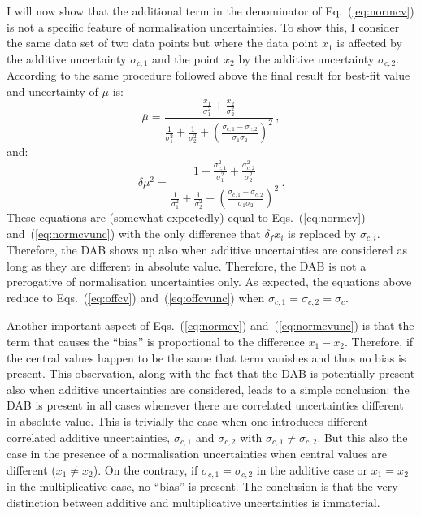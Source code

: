 \documentclass[10pt,a4paper]{article}
\begin{document}
I will now show that the additional term in the denominator of
Eq.~(\ref{eq:normcv}) is not a specific feature of normalisation
uncertainties. To show this, I consider the same data set of two data
points but where the data point $x_1$ is affected by the additive
uncertainty $\sigma_{c,1}$ and the point $x_2$ by the additive
uncertainty $\sigma_{c,2}$. According to the same procedure followed
above the final result for best-fit value and uncertainty of $\mu$ is:
\begin{equation}\label{eq:add2cv}
\overline{\mu} = \frac{\frac{x_1}{\sigma_1^2}+\frac{x_2}{\sigma_2^2}}{\frac{1}{\sigma_1^2}+\frac{1}{\sigma_2^2}+\left(\frac{\sigma_{c,1}-\sigma_{c,2}}{\sigma_1\sigma_2}\right)^2}\,,
\end{equation}
and:
\begin{equation}
  \delta\mu^2=\frac{1+\frac{\sigma_{c,1}^2}{\sigma_1^2}+\frac{\sigma_{c,2}^2}{\sigma_2^2}}{\frac{1}{\sigma_1^2}+ \frac{1}{\sigma_2^2}+\left(\frac{\sigma_{c,1} -\sigma_{c,2}}{\sigma_1\sigma_2}\right)^2}\,.
\end{equation}
These equations are (somewhat expectedly) equal to
Eqs.~(\ref{eq:normcv}) and~(\ref{eq:normcvunc}) with the only
difference that $\delta_fx_i$ is replaced by
$\sigma_{c,i}$. Therefore, the DAB shows up also when additive
uncertainties are considered as long as they are different in absolute
value. Therefore, the DAB is not a prerogative of normalisation
uncertainties only. As expected, the equations above reduce to
Eqs.~(\ref{eq:offcv}) and~(\ref{eq:offcvunc}) when
$\sigma_{c,1}=\sigma_{c,2}=\sigma_{c}$.

Another important aspect of Eqs.~(\ref{eq:normcv})
and~(\ref{eq:normcvunc}) is that the term that causes the ``bias'' is
proportional to the difference $x_1-x_2$. Therefore, if the central
values happen to be the same that term vanishes and thus no bias is
present. This observation, along with the fact that the DAB is
potentially present also when additive uncertainties are considered,
leads to a simple conclusion: the DAB is present in all cases whenever
there are correlated uncertainties different in absolute value. This
is trivially the case when one introduces different correlated
additive uncertainties, $\sigma_{c,1}$ and $\sigma_{c,2}$ with
$\sigma_{c,1}\neq \sigma_{c,2}$. But this also the case in the
presence of a normalisation uncertainties when central values are
different ($x_1\neq x_2$). On the contrary, if
$\sigma_{c,1}= \sigma_{c,2}$ in the additive case or $x_1=x_2$ in the
multiplicative case, no ``bias'' is present. The conclusion is that
the very distinction between additive and multiplicative uncertainties
is immaterial.
\end{document}
